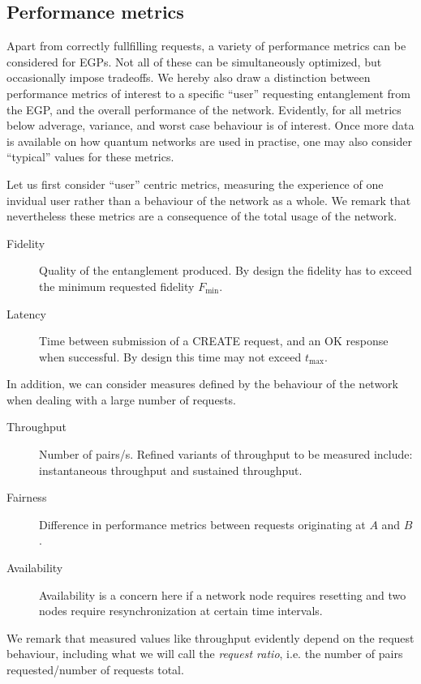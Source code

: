 \documentclass{article}
\begin{document}
\subsection{Performance metrics}

Apart from correctly fullfilling requests, a variety of performance metrics can be considered for EGPs. Not all of these can be simultaneously optimized, but occasionally impose tradeoffs.
We hereby also draw a distinction between performance metrics of interest to a specific ``user'' requesting entanglement from the EGP, and the overall performance of the network. 
Evidently, for all metrics below adverage, variance, and worst case behaviour is of interest. Once more data is available on how quantum networks are used in practise, one may also consider ``typical'' values for these metrics.

Let us first consider ``user'' centric metrics, measuring the experience of one invidual user rather than a behaviour of the network as a whole. We remark that nevertheless these metrics
are a consequence of the total usage of the network.
\begin{description}
\item[Fidelity] Quality of the entanglement produced. By design the fidelity has to exceed the minimum requested fidelity $F_{\min}$. 
\item[Latency] Time between submission of a CREATE request, and an OK response when successful. By design this time may not exceed $t_{\max}$.
\end{description}
In addition, we can consider measures defined by the behaviour of the network when dealing with a large number of requests.
\begin{description}
\item[Throughput] Number of pairs/s. Refined variants of throughput to be measured include: instantaneous throughput and sustained throughput.
\item[Fairness] Difference in performance metrics between requests originating at $A$ and $B$.
\item[Availability] Availability is a concern here if a network node requires resetting and two nodes require resynchronization at certain time intervals.
\end{description}
We remark that measured values like throughput evidently depend on the request behaviour, including what we will call the \emph{request ratio}, i.e. the number of pairs requested/number of requests total. 
\end{document}
